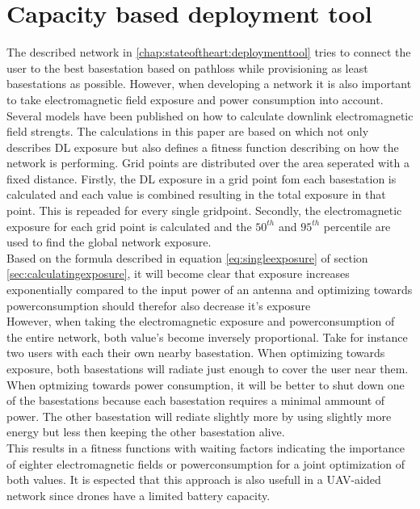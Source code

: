 \section{Capacity based deployment tool}
\label{chap:capbaseddeploymenttool}

The described network in \ref{chap:stateoftheart:deploymenttool} tries to connect the user to the best basestation based on pathloss while provisioning as least basestations as possible.
However, when developing a network it is also important to take electromagnetic field exposure and power consumption into account. Several models have been published on how to calculate downlink electromagnetic field strengts. 
The calculations in this paper are based on \cite{J1} which not only describes \gls{DL} exposure but also defines a fitness function describing on how the network is performing. 
Grid points are distributed over the area seperated with a fixed distance. Firstly, the \gls{DL} exposure in a grid point fom each basestation is calculated and each value is combined resulting
in the total exposure in that point. This is repeaded for every single gridpoint.
Secondly, the electromagnetic exposure for each grid point is calculated and the $50^{th}$ and $95^{th}$ percentile are used to find the global network exposure. \\

Based on the formula described in equation \ref{eq:singleexposure} of section \ref{sec:calculatingexposure}, it will become clear that exposure increases exponentially compared to the input power
of an antenna and optimizing towards powerconsumption should therefor also decrease it's exposure\\

However, when taking the electromagnetic exposure and powerconsumption of the entire network, both value's become inversely proportional. Take for instance two users with each their own nearby basestation.
When optimizing towards exposure, both basestations will radiate just enough to cover the user near them. When optmizing towards power consumption, it will be better to shut down one of the basestations because
each basestation requires a minimal ammount of power. The other basestation will rediate slightly more by using slightly more energy but less then keeping the other basestation alive. \\

This results in a fitness functions with waiting factors indicating the importance of eighter electromagnetic fields or powerconsumption for a joint optimization of both values.
It is espected that this approach is also usefull in a UAV-aided network since drones have a limited battery capacity. \\


